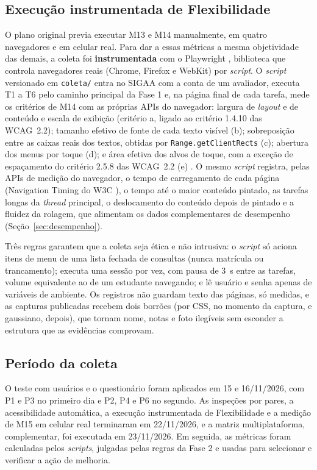 \subsection{Execução instrumentada de Flexibilidade}
\label{sec:instrumentacao}

O plano original previa executar M13 e M14 manualmente, em quatro navegadores e em celular real. Para dar a essas métricas a mesma objetividade das demais, a coleta foi \textbf{instrumentada} com o Playwright \cite{playwright}, biblioteca que controla navegadores reais (Chrome, Firefox e WebKit) por \textit{script}. O \textit{script} versionado em \texttt{coleta/} entra no SIGAA com a conta de um avaliador, executa T1 a T6 pelo caminho principal da Fase 1 e, na página final de cada tarefa, mede os critérios de M14 com as próprias APIs do navegador: largura de \textit{layout} e de conteúdo e escala de exibição (critério a, ligado ao critério 1.4.10 das WCAG~2.2); tamanho efetivo de fonte de cada texto visível (b); sobreposição entre as caixas reais dos textos, obtidas por \texttt{Range.getClientRects} (c); abertura dos menus por toque (d); e área efetiva dos alvos de toque, com a exceção de espaçamento do critério 2.5.8 das WCAG~2.2 (e) \cite{wcag22}. O mesmo \textit{script} registra, pelas APIs de medição do navegador, o tempo de carregamento de cada página (Navigation Timing do W3C \cite{navtiming}), o tempo até o maior conteúdo pintado, as tarefas longas da \textit{thread} principal, o deslocamento do conteúdo depois de pintado e a fluidez da rolagem, que alimentam os dados complementares de desempenho (Seção~\ref{sec:desempenho}).

Três regras garantem que a coleta seja ética e não intrusiva: o \textit{script} só aciona itens de menu de uma lista fechada de consultas (nunca matrícula ou trancamento); executa uma sessão por vez, com pausa de 3~s entre as tarefas, volume equivalente ao de um estudante navegando; e lê usuário e senha apenas de variáveis de ambiente. Os registros não guardam texto das páginas, só medidas, e as capturas publicadas recebem dois borrões (por CSS, no momento da captura, e gaussiano, depois), que tornam nome, notas e foto ilegíveis sem esconder a estrutura que as evidências comprovam.

\subsection{Período da coleta}

O teste com usuários e o questionário foram aplicados em 15 e 16/11/2026, com P1 e P3 no primeiro dia e P2, P4 e P6 no segundo. As inspeções por pares, a acessibilidade automática, a execução instrumentada de Flexibilidade e a medição de M15 em celular real terminaram em 22/11/2026, e a matriz multiplataforma, complementar, foi executada em 23/11/2026. Em seguida, as métricas foram calculadas pelos \textit{scripts}, julgadas pelas regras da Fase 2 e usadas para selecionar e verificar a ação de melhoria.
